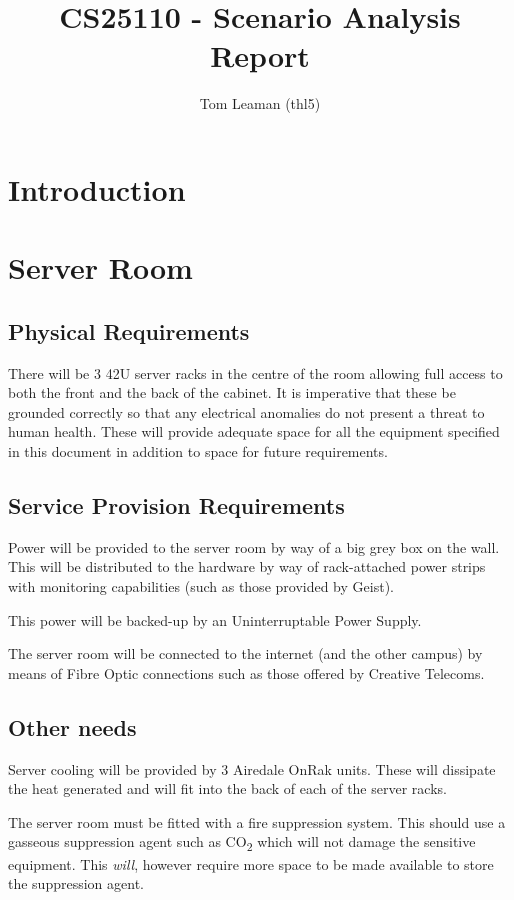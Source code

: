 \documentclass[a4paper, twoside]{article}
\title{CS25110 - Scenario Analysis Report}
\author{Tom Leaman (thl5)}
\begin{document}
\maketitle
\newpage
\tableofcontents
\newpage

\section{Introduction}

\section{Server Room}
\subsection{Physical Requirements}

There will be 3 42U server racks in the centre of the room allowing full access
to both the front and the back of the cabinet. It is imperative that these be
grounded correctly so that any electrical anomalies do not present a threat to
human health. These will provide adequate space for all the equipment specified
in this document in addition to space for future requirements.

\subsection{Service Provision Requirements}
Power will be provided to the server room by way of a big grey box on the wall.
This will be distributed to the hardware by way of rack-attached power strips
with monitoring capabilities (such as those provided by Geist).

This power will be backed-up by an Uninterruptable Power Supply. %

The server room will be connected to the internet (and the other campus) by
means of Fibre Optic connections such as those offered by Creative Telecoms.

\subsection{Other needs}
Server cooling will be provided by 3 Airedale OnRak units. These will dissipate
the heat generated and will fit into the back of each of the server racks.

The server room must be fitted with a fire suppression system. This should use a
gasseous suppression agent such as CO\textsubscript{2} which will not damage the
sensitive equipment. This \emph{will}, however require more space to be made
available to store the suppression agent.
\end{document}
